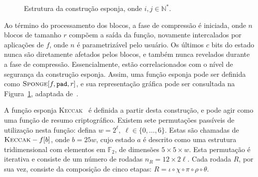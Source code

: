 \documentclass[12pt,notitlepage]{report}
\begin{document}
\begin{figure}[ht]
  \caption{Estrutura da construção esponja, onde $i, j \in \mathbb{N}^{*}$.}
  \label{fig:3}
\end{figure}

Ao término do processamento dos blocos, a fase de compressão é iniciada, onde
$n$ blocos de tamanho $r$ compõem a saída da função, novamente intercalados por
aplicações de $f$, onde $n$ é parametrizável pelo usuário. Os últimos $c$ bits
do estado nunca são diretamente afetados pelos blocos, e também nunca revelados
durante a fase de compressão. Essencialmente, estão correlacionados com o nível
de segurança da construção esponja. Assim, uma função esponja pode ser definida
como $\textsc{Sponge}[f, \texttt{pad}, r]$, e sua representação gráfica pode
ser consultada na Figura~\ref{fig:3}, adaptada de~\cite{TikZ:for:Cryptographers}.

A função esponja \textsc{Keccak}~\cite{KeccakReference} é definida a partir
desta construção, e pode agir como uma função de resumo criptográfico. Existem
sete permutações passíveis de utilização nesta função: defina $w = 2^{\ell}, \;
\ell \in \{0, \dots, 6\}$.  Estas são chamadas de $\textsc{Keccak}-f[b]$, onde
$b = 25w$, cujo estado $a$ é descrito como uma estrutura tridimensional com
elementos em $\mathbb{F}_2$, de dimensões $5 \times 5 \times w$. Esta
permutação é iterativa e consiste de um número de rodadas
$n_R = 12 \times 2 \ell$. Cada rodada $R$, por sua vez, consiste da composição
de cinco etapas: $R = \iota \circ \chi \circ \pi \circ \rho \circ \theta$.
\end{document}
